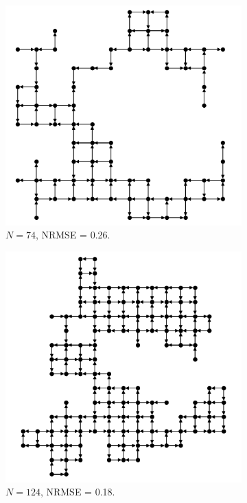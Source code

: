 \begin{figure}[htb]
  \centering
  \begin{subfigure}{1.0\textwidth} \centering
\includegraphics[width=0.5\linewidth]{figures/sq-grid-grow-74.png}
    \caption{$N = 74$, NRMSE = 0.26.}
    \label{fig:sq-grid-grow-74}
  \end{subfigure}
  \begin{subfigure}{.49\textwidth} \centering
\includegraphics[width=1.0\linewidth]{figures/sq-grid-grow-124.png}
    \caption{$N = 124$, NRMSE = 0.18.}
    \label{fig:sq-grid-grow-124}
  \end{subfigure}
  \begin{subfigure}{.49\textwidth} \centering

\end{subfigure}
\end{figure}
